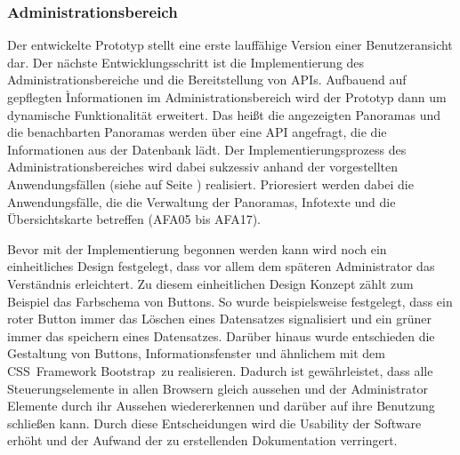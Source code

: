 \subsubsection{Administrationsbereich}
\label{sec:UmsetzungAdministrationsbereich}

Der entwickelte Prototyp stellt eine erste lauffähige Version einer Benutzeransicht dar. Der nächste Entwicklungsschritt ist die Implementierung des Administrationsbereiche und die Bereitstellung von APIs. Aufbauend auf gepflegten Ìnformationen im Administrationsbereich wird der Prototyp dann um dynamische Funktionalität erweitert. Das heißt die angezeigten Panoramas und die benachbarten Panoramas werden über eine API angefragt, die die Informationen aus der Datenbank lädt. Der Implementierungsprozess des Administrationsbereiches wird dabei sukzessiv anhand der vorgestellten Anwendungsfällen (siehe  auf Seite \pageref{sec:Adminstratoranwendungen}) realisiert. Prioresiert werden dabei die Anwendungsfälle, die die Verwaltung der Panoramas, Infotexte und die Übersichtskarte betreffen (AFA05 bis AFA17).

Bevor mit der Implementierung begonnen werden kann wird noch ein einheitliches Design festgelegt, dass vor allem dem späteren Administrator das Verständnis erleichtert. Zu diesem einheitlichen Design Konzept zählt zum Beispiel das Farbschema von Buttons. So wurde beispielsweise festgelegt, dass ein roter Button immer das Löschen eines Datensatzes signalisiert und ein grüner immer das speichern eines Datensatzes. Darüber hinaus wurde entschieden die Gestaltung von Buttons, Informationsfenster und ähnlichem mit dem CSS\footnotemark\ Framework Bootstrap\footnotemark\ zu realisieren. Dadurch ist gewährleistet, dass alle Steuerungselemente in allen Browsern gleich aussehen und der Administrator Elemente durch ihr Aussehen wiedererkennen und darüber auf ihre Benutzung schließen kann. Durch diese Entscheidungen wird die Usability der Software erhöht und der Aufwand der zu erstellenden Dokumentation verringert.




